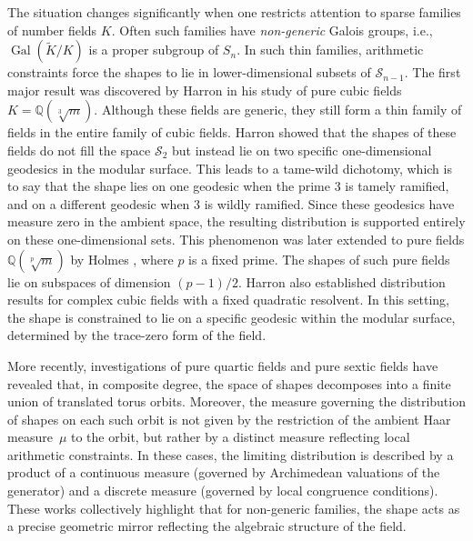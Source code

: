\documentclass{amsart}
\newcommand{\Q}{\mathbb{Q}}
\newcommand{\op}[1]{\operatorname{#1}}
\theoremstyle{plain}
\theoremstyle{definition}
\theoremstyle{remark}
\numberwithin{equation}{section}
\begin{document}
\par The situation changes significantly when one restricts attention to sparse families of number fields $K$. Often such families have \emph{non-generic} Galois groups, i.e., $\op{Gal}(\widetilde{K}/K)$ is a proper subgroup of $S_n$. In such thin families, arithmetic constraints force the shapes to lie in lower-dimensional subsets of $\mathcal S_{n-1}$. The first major result was discovered by Harron \cite{Har17} in his study of pure cubic fields $K = \Q(\sqrt[3]{m})$. Although these fields are generic, they still form a thin family of fields in the entire family of cubic fields. Harron showed that the shapes of these fields do not fill the space $\mathcal S_2$ but instead lie on two specific one-dimensional geodesics in the modular surface. This leads to a tame-wild dichotomy, which is to say that the shape lies on one geodesic when the prime $3$ is tamely ramified, and on a different geodesic when $3$ is wildly ramified. Since these geodesics have measure zero in the ambient space, the resulting distribution is supported entirely on these one-dimensional sets. This phenomenon was later extended to pure fields $\Q(\sqrt[p]{m})$ by Holmes \cite{Holmes}, where $p$ is a fixed prime. The shapes of such pure fields lie on subspaces of dimension $(p-1)/2$. Harron \cite{HarronANT} also established distribution results for complex cubic fields with a fixed quadratic resolvent. In this setting, the shape is constrained to lie on a specific geodesic within the modular surface, determined by the trace-zero form of the field. 

\par More recently, investigations of pure quartic fields \cite{purequartic} and pure sextic fields \cite{JKRR26} have revealed that, in composite degree, the space of shapes decomposes into a finite union of translated torus orbits. Moreover, the measure governing the distribution of shapes on each such orbit is not given by the restriction of the ambient Haar measure~$\mu$ to the orbit, but rather by a distinct measure reflecting local arithmetic constraints. In these cases, the limiting distribution is described by a product of a continuous measure (governed by Archimedean valuations of the generator) and a discrete measure (governed by local congruence conditions). These works collectively highlight that for non-generic families, the shape acts as a precise geometric mirror reflecting the algebraic structure of the field.
\end{document}
